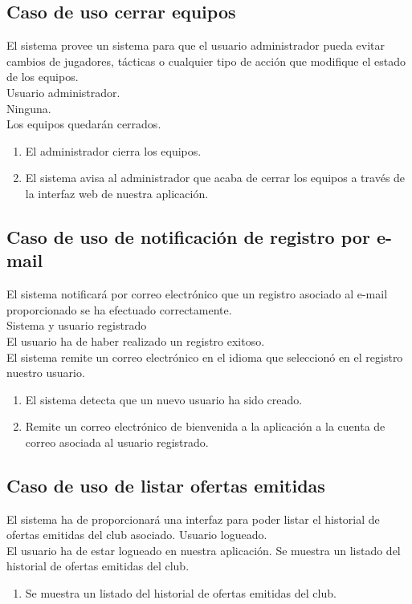 \subsection{Caso de uso cerrar equipos}
 El sistema provee un sistema para que el usuario
administrador pueda evitar cambios de jugadores, tácticas o
cualquier tipo de acción que modifique el estado de los equipos.\\
 Usuario administrador. \\
 Ninguna. \\
 Los equipos quedarán cerrados. \\
\begin{enumerate}
\item El administrador cierra los equipos.
\item El sistema avisa al administrador que acaba de cerrar los equipos a través
  de la interfaz web de nuestra aplicación.
\end{enumerate}

\subsection{Caso de uso de notificación de registro por e-mail}
 El sistema notificará por correo electrónico
que un registro asociado al e-mail proporcionado se ha efectuado correctamente.\\
 Sistema y usuario registrado \\
 El usuario ha de haber realizado un registro exitoso. \\
 El sistema remite un correo electrónico en
el idioma que seleccionó en el registro nuestro usuario. \\
\begin{enumerate}
\item El sistema detecta que un nuevo usuario ha sido creado.
\item Remite un correo electrónico de bienvenida a la aplicación a la cuenta de
  correo asociada al usuario registrado.
\end{enumerate}

\subsection{Caso de uso de listar ofertas emitidas}
 El sistema ha de proporcionará una interfaz para poder
listar el historial de ofertas emitidas del club asociado.
 Usuario logueado. \\
 El usuario ha de estar logueado en nuestra aplicación.
 Se muestra un listado del historial de ofertas
emitidas del club.  
\begin{enumerate}
\item Se muestra un listado del historial de ofertas emitidas del club.
\end{enumerate}

